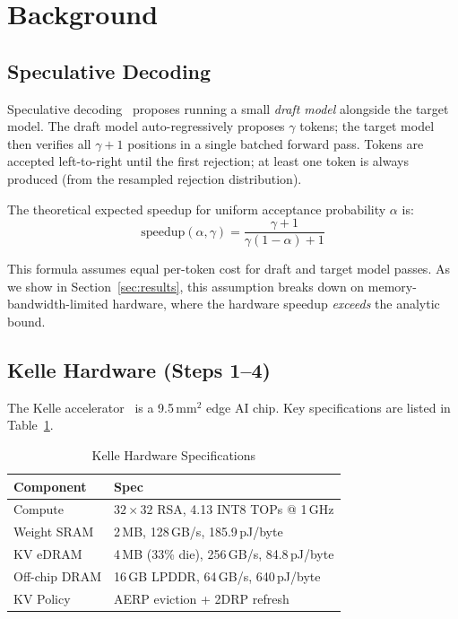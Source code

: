 \documentclass[conference]{IEEEtran}
\begin{document}
\section{Background}

\subsection{Speculative Decoding}

Speculative decoding~\cite{leviathan2023,chen2023} proposes running a small
\emph{draft model} alongside the target model.
The draft model auto-regressively proposes $\gamma$ tokens; the target model
then verifies all $\gamma{+}1$ positions in a single batched forward pass.
Tokens are accepted left-to-right until the first rejection; at least one token
is always produced (from the resampled rejection distribution).

The theoretical expected speedup for uniform acceptance probability $\alpha$ is:
\begin{equation}
  \text{speedup}(\alpha, \gamma) = \frac{\gamma + 1}{\gamma(1-\alpha) + 1}
  \label{eq:analytic}
\end{equation}

This formula assumes equal per-token cost for draft and target model passes.
As we show in Section~\ref{sec:results}, this assumption breaks down on
memory-bandwidth-limited hardware, where the hardware speedup \emph{exceeds}
the analytic bound.

\subsection{Kelle Hardware (Steps 1--4)}

The Kelle accelerator~\cite{kelle2025} is a 9.5\,mm$^2$ edge AI chip.
Key specifications are listed in Table~\ref{tab:kelle_hw}.

\begin{table}[t]
  \caption{Kelle Hardware Specifications}
  \label{tab:kelle_hw}
  \centering
  \begin{tabular}{ll}
    \toprule
    \textbf{Component} & \textbf{Spec} \\
    \midrule
    Compute     & $32{\times}32$ RSA, 4.13 INT8 TOPs @ 1\,GHz \\
    Weight SRAM & 2\,MB, 128\,GB/s, 185.9\,pJ/byte \\
    KV eDRAM    & 4\,MB (33\% die), 256\,GB/s, 84.8\,pJ/byte \\
    Off-chip DRAM & 16\,GB LPDDR, 64\,GB/s, 640\,pJ/byte \\
    KV Policy   & AERP eviction + 2DRP refresh \\
    \bottomrule
  \end{tabular}
\end{table}
\end{document}
